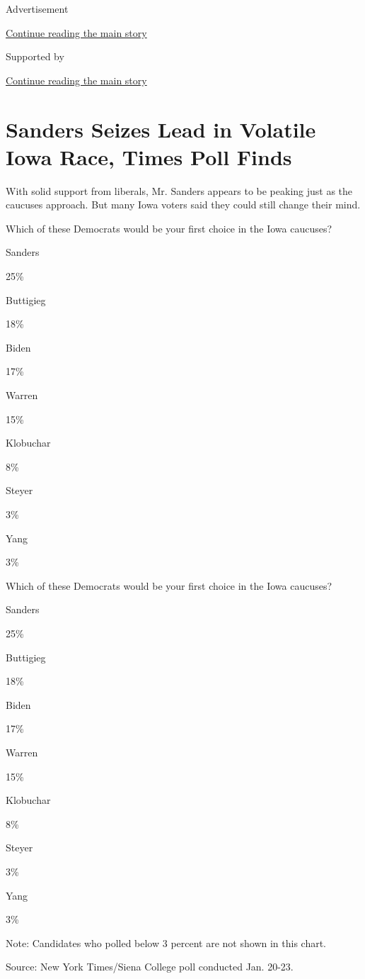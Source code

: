 Advertisement

\protect\hyperlink{after-top}{Continue reading the main story}

Supported by

\protect\hyperlink{after-sponsor}{Continue reading the main story}

\hypertarget{sanders-seizes-lead-in-volatile-iowa-race-times-poll-finds}{%
\section{Sanders Seizes Lead in Volatile Iowa Race, Times Poll
Finds}\label{sanders-seizes-lead-in-volatile-iowa-race-times-poll-finds}}

With solid support from liberals, Mr. Sanders appears to be peaking just
as the caucuses approach. But many Iowa voters said they could still
change their mind.

Which of these Democrats would be your first choice in the Iowa
caucuses?

Sanders

25\%

Buttigieg

18\%

Biden

17\%

Warren

15\%

Klobuchar

8\%

Steyer

3\%

Yang

3\%

Which of these Democrats would be your first choice in the Iowa
caucuses?

Sanders

25\%

Buttigieg

18\%

Biden

17\%

Warren

15\%

Klobuchar

8\%

Steyer

3\%

Yang

3\%

Note: Candidates who polled below 3 percent are not shown in this chart.

Source: New York Times/Siena College poll conducted Jan. 20-23.

